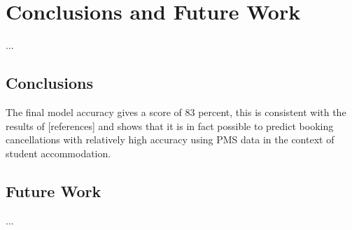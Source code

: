 \chapter{Conclusions and Future Work}
\label{ch:con}
...

\section{Conclusions}
The final model accuracy gives a score  of 83 percent, this is consistent with the results of [references] and shows that it is in fact possible to predict booking cancellations with relatively high accuracy using PMS data in the context of student accommodation. 

\section{Future Work}
...